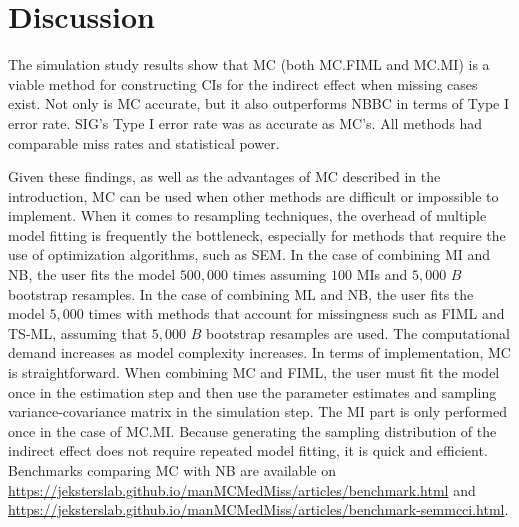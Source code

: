 \documentclass[man]{apa7}\usepackage[]{graphicx}\usepackage[]{xcolor}
\begin{document}
\section{Discussion}

The simulation study results show that MC (both MC.FIML and MC.MI) is a viable method for constructing CIs for the indirect effect when missing cases exist.
Not only is MC accurate,
but it also outperforms NBBC in terms of Type I error rate.
SIG's Type I error rate was as accurate as MC's.
All methods had comparable miss rates and statistical power.

Given these findings,
as well as the advantages of MC described in the introduction,
MC can be used when other methods are difficult or impossible to implement.
When it comes to resampling techniques,
the overhead of multiple model fitting is frequently the bottleneck,
especially for methods that require the use of optimization algorithms,
such as SEM.
In the case of combining MI and NB,
the user fits the model $500,000$ times assuming $100$ MIs and $5,000$ $B$ bootstrap resamples.
In the case of combining ML and NB,
the user fits the model $5,000$ times with methods that account for missingness such as FIML and TS-ML,
assuming that $5,000$ $B$ bootstrap resamples are used.
The computational demand increases as model complexity increases.
In terms of implementation,
MC is straightforward.
When combining MC and FIML,
the user must fit the model once in the estimation step and then use the parameter estimates and sampling variance-covariance matrix in the simulation step.
The MI part is only performed once in the case of MC.MI.
Because generating the sampling distribution of the indirect effect does not require repeated model fitting,
it is quick and efficient.
Benchmarks comparing MC with NB are available on
\url{https://jeksterslab.github.io/manMCMedMiss/articles/benchmark.html} and \url{https://jeksterslab.github.io/manMCMedMiss/articles/benchmark-semmcci.html}.
\end{document}
